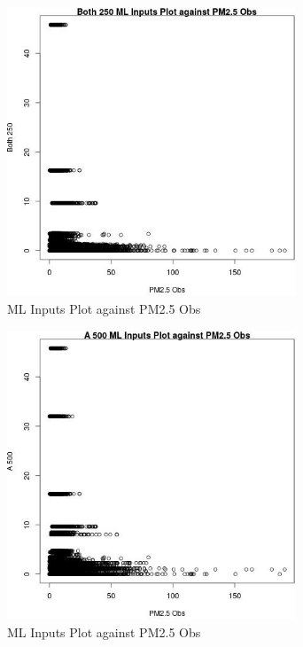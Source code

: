 \begin{figure} 
\centering  
\includegraphics[width=0.77\textwidth]{Code_Outputs/Report_ML_input_PM25_Step4_part_e_de_duplicated_aves_Both_250vPM25_Obs.jpg} 
\caption{\label{fig:Report_ML_input_PM25_Step4_part_e_de_duplicated_avesBoth_250vPM25_Obs}ML Inputs Plot against PM2.5 Obs} 
\end{figure} 
 

\clearpage 

\begin{figure} 
\centering  
\includegraphics[width=0.77\textwidth]{Code_Outputs/Report_ML_input_PM25_Step4_part_e_de_duplicated_aves_A_500vPM25_Obs.jpg} 
\caption{\label{fig:Report_ML_input_PM25_Step4_part_e_de_duplicated_avesA_500vPM25_Obs}ML Inputs Plot against PM2.5 Obs} 
\end{figure} 
 

